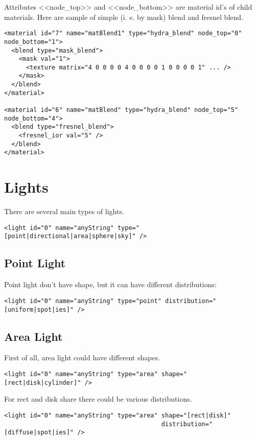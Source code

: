\documentclass[a4paper,11pt]{report}
\begin{document}
Attributes <<node\_top>> and <<node\_bottom>> are material id's of child materials. Here are sample of simple (i. e. by mask) blend and fresnel blend.

\lstset{language=XML}
\begin{lstlisting}
<material id="7" name="matBlend1" type="hydra_blend" node_top="0" node_bottom="1">
  <blend type="mask_blend">
    <mask val="1">
      <texture matrix="4 0 0 0 0 4 0 0 0 0 1 0 0 0 0 1" ... />
    </mask>
  </blend>
</material>

<material id="6" name="matBlend" type="hydra_blend" node_top="5" node_bottom="4">
  <blend type="fresnel_blend">
    <fresnel_ior val="5" />
  </blend>
</material>

\end{lstlisting}

\section{Lights}

There are several main types of lights.

\lstset{language=XML}
\begin{lstlisting}
<light id="0" name="anyString" type="[point|directional|area|sphere|sky]" />
\end{lstlisting}

\subsection{Point Light}

Point light don't have shape, but it can have different distributions:
\lstset{language=XML}
\begin{lstlisting}
<light id="0" name="anyString" type="point" distribution="[uniform|spot|ies]" />
\end{lstlisting}

\subsection{Area Light}

First of all, area light could have different shapes.
\lstset{language=XML}
\begin{lstlisting}
<light id="0" name="anyString" type="area" shape="[rect|disk|cylinder]" />
\end{lstlisting}

For rect and disk share there could be various distributions.

\lstset{language=XML}
\begin{lstlisting}
<light id="0" name="anyString" type="area" shape="[rect|disk]" 
                                           distribution="[diffuse|spot|ies]" />
\end{lstlisting}
\end{document}
